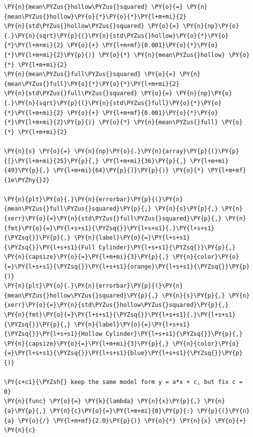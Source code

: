     \begin{tcolorbox}[breakable, size=fbox, boxrule=1pt, pad at break*=1mm,colback=cellbackground, colframe=cellborder]
\begin{Verbatim}[commandchars=\\\{\}]
\PY{n}{mean\PYZus{}hollow\PYZus{}squared} \PY{o}{=} \PY{n}{mean\PYZus{}hollow}\PY{o}{*}\PY{o}{*}\PY{l+m+mi}{2}
\PY{n}{std\PYZus{}hollow\PYZus{}squared} \PY{o}{=} \PY{n}{np}\PY{o}{.}\PY{n}{sqrt}\PY{p}{(}\PY{n}{std\PYZus{}hollow}\PY{o}{*}\PY{o}{*}\PY{l+m+mi}{2} \PY{o}{+} \PY{l+m+mf}{0.001}\PY{o}{*}\PY{o}{*}\PY{l+m+mi}{2}\PY{p}{)} \PY{o}{*} \PY{n}{mean\PYZus{}hollow} \PY{o}{*} \PY{l+m+mi}{2}
\PY{n}{mean\PYZus{}full\PYZus{}squared} \PY{o}{=} \PY{n}{mean\PYZus{}full}\PY{o}{*}\PY{o}{*}\PY{l+m+mi}{2}
\PY{n}{std\PYZus{}full\PYZus{}squared} \PY{o}{=} \PY{n}{np}\PY{o}{.}\PY{n}{sqrt}\PY{p}{(}\PY{n}{std\PYZus{}full}\PY{o}{*}\PY{o}{*}\PY{l+m+mi}{2} \PY{o}{+} \PY{l+m+mf}{0.001}\PY{o}{*}\PY{o}{*}\PY{l+m+mi}{2}\PY{p}{)} \PY{o}{*} \PY{n}{mean\PYZus{}full} \PY{o}{*} \PY{l+m+mi}{2}

\PY{n}{s} \PY{o}{=} \PY{n}{np}\PY{o}{.}\PY{n}{array}\PY{p}{(}\PY{p}{[}\PY{l+m+mi}{25}\PY{p}{,} \PY{l+m+mi}{36}\PY{p}{,} \PY{l+m+mi}{49}\PY{p}{,} \PY{l+m+mi}{64}\PY{p}{]}\PY{p}{)} \PY{o}{*} \PY{l+m+mf}{1e\PYZhy{}2}

\PY{n}{plt}\PY{o}{.}\PY{n}{errorbar}\PY{p}{(}\PY{n}{mean\PYZus{}full\PYZus{}squared}\PY{p}{,} \PY{n}{s}\PY{p}{,} \PY{n}{xerr}\PY{o}{=}\PY{n}{std\PYZus{}full\PYZus{}squared}\PY{p}{,} \PY{n}{fmt}\PY{o}{=}\PY{l+s+s1}{\PYZsq{}}\PY{l+s+s1}{.}\PY{l+s+s1}{\PYZsq{}}\PY{p}{,} \PY{n}{label}\PY{o}{=}\PY{l+s+s1}{\PYZsq{}}\PY{l+s+s1}{Full Cylinder}\PY{l+s+s1}{\PYZsq{}}\PY{p}{,} \PY{n}{capsize}\PY{o}{=}\PY{l+m+mi}{3}\PY{p}{,} \PY{n}{color}\PY{o}{=}\PY{l+s+s1}{\PYZsq{}}\PY{l+s+s1}{orange}\PY{l+s+s1}{\PYZsq{}}\PY{p}{)}
\PY{n}{plt}\PY{o}{.}\PY{n}{errorbar}\PY{p}{(}\PY{n}{mean\PYZus{}hollow\PYZus{}squared}\PY{p}{,} \PY{n}{s}\PY{p}{,} \PY{n}{xerr}\PY{o}{=}\PY{n}{std\PYZus{}hollow\PYZus{}squared}\PY{p}{,} \PY{n}{fmt}\PY{o}{=}\PY{l+s+s1}{\PYZsq{}}\PY{l+s+s1}{.}\PY{l+s+s1}{\PYZsq{}}\PY{p}{,} \PY{n}{label}\PY{o}{=}\PY{l+s+s1}{\PYZsq{}}\PY{l+s+s1}{Hollow Cylinder}\PY{l+s+s1}{\PYZsq{}}\PY{p}{,} \PY{n}{capsize}\PY{o}{=}\PY{l+m+mi}{3}\PY{p}{,} \PY{n}{color}\PY{o}{=}\PY{l+s+s1}{\PYZsq{}}\PY{l+s+s1}{blue}\PY{l+s+s1}{\PYZsq{}}\PY{p}{)}

\PY{c+c1}{\PYZsh{} keep the same model form y = a*x + c, but fix c = 0}
\PY{n}{func} \PY{o}{=} \PY{k}{lambda} \PY{n}{x}\PY{p}{,} \PY{n}{a}\PY{p}{,} \PY{n}{c}\PY{o}{=}\PY{l+m+mi}{0}\PY{p}{:} \PY{p}{(}\PY{n}{a} \PY{o}{/} \PY{l+m+mf}{2.0}\PY{p}{)} \PY{o}{*} \PY{n}{x} \PY{o}{+} \PY{n}{c}


\end{Verbatim}
\end{tcolorbox}
